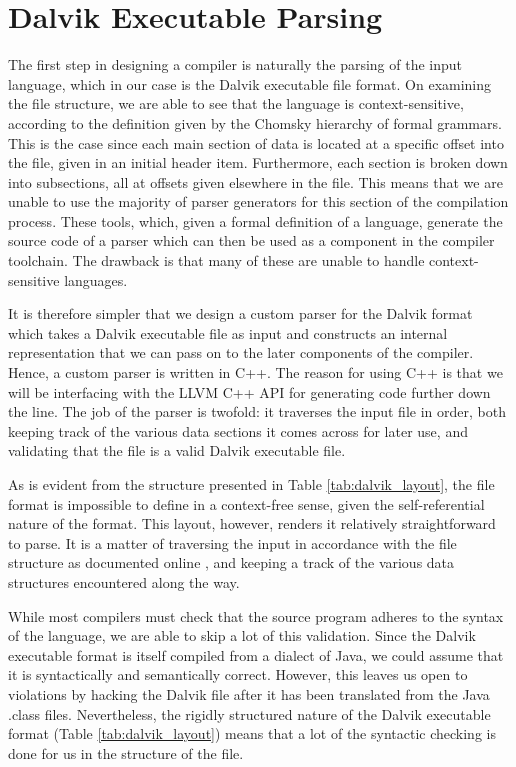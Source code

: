 \section{Dalvik Executable Parsing}
\label{sec:parsing}

The first step in designing a compiler is naturally the parsing of the input language, which in our case is the Dalvik executable file format. On examining the file structure, we are able to see that the language is context-sensitive, according to the definition given by the Chomsky hierarchy of formal grammars. This is the case since each main section of data is located at a specific offset into the file, given in an initial header item. Furthermore, each section is broken down into subsections, all at offsets given elsewhere in the file. This means that we are unable to use the majority of parser generators for this section of the compilation process. These tools, which, given a formal definition of a language, generate the source code of a parser which can then be used as a component in the compiler toolchain. The drawback is that many of these are unable to handle context-sensitive languages.


It is therefore simpler that we design a custom parser for the Dalvik format which takes a Dalvik executable file as input and constructs an internal representation that we can pass on to the later components of the compiler. Hence, a custom parser is written in C++. The reason for using C++ is that we will be interfacing with the LLVM C++ API for generating code further down the line. The job of the parser is twofold: it traverses the input file in order, both keeping track of the various data sections it comes across for later use, and validating that the file is a valid Dalvik executable file.

As is evident from the structure presented in Table \ref{tab:dalvik_layout}, the file format is impossible to define in a context-free sense, given the self-referential nature of the format. This layout, however, renders it relatively straightforward to parse. It is a matter of traversing the input in accordance with the file structure as documented online \cite{dvk_format}, and keeping a track of the various data structures encountered along the way.

While most compilers must check that the source program adheres to the syntax of the language, we are able to skip a lot of this validation. Since the Dalvik executable format is itself compiled from a dialect of Java, we could assume that it is syntactically and semantically correct. However, this leaves us open to violations by hacking the Dalvik file after it has been translated from the Java .class files. Nevertheless, the rigidly structured nature of the Dalvik executable format (Table \ref{tab:dalvik_layout}) means that a lot of the syntactic checking is done for us in the structure of the file.

